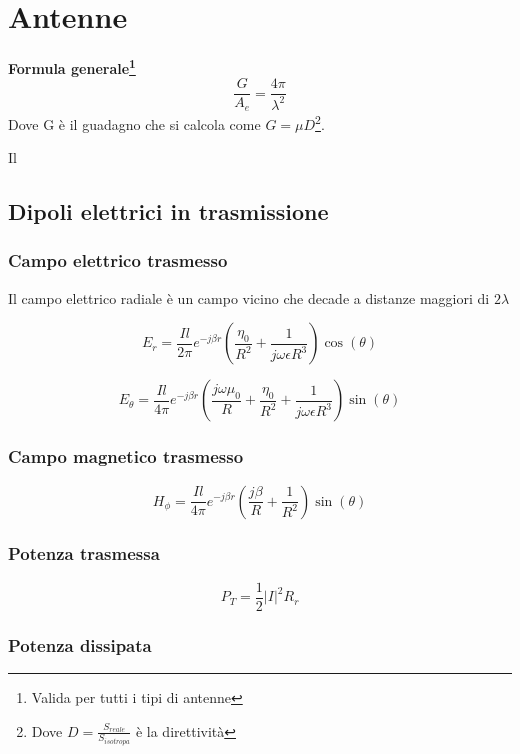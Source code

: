 \documentclass[10pt,a4paper]{report}
\begin{document}
\chapter{Antenne}
		\textbf{Formula generale\footnote{Valida per tutti i tipi di antenne}}
		\begin{equation}
		\frac{G}{A_e}=\frac{4\pi}{\lambda^2}
		\end{equation}
	    Dove G è il guadagno che si calcola come $G=\mu D$\footnote{Dove $D=\frac{S_{reale}}{S_{isotropa}}$ è la direttività}.

	    Il
	 \section{Dipoli elettrici in trasmissione}

		\subsection{Campo elettrico trasmesso}

		Il campo elettrico radiale è un campo vicino che decade a distanze maggiori di $2\lambda$
		
		\begin{equation}
		E_r=\frac{I{l}}{2\pi}e^{-j\beta r}(\frac{ \eta_0}{R^2}+\frac{1}{j \omega \epsilon R^3})\cos(\theta)
		\end{equation}
		
		\[
		 E_{\theta} = \frac {Il} {4\pi} e^{-j\beta r} ( \frac {j\omega \mu_0} {R} + \frac {\eta_0} {R^2} + \frac {1}  {j \omega \epsilon R^3} ) \sin(\theta)
		\]

		\subsection{Campo magnetico trasmesso}

		\begin{equation}
		H_{\phi}=\frac{Il}{4\pi}e^{-j\beta r}(\frac{j \beta}{R}+\frac{1}{R^2})\sin(\theta)
		\end{equation}

		\subsection{Potenza trasmessa}

	  \[
	  P_T=\frac{1}{2}|I|^2R_r
	  \]

	  	\subsection{Potenza dissipata}
\end{document}
